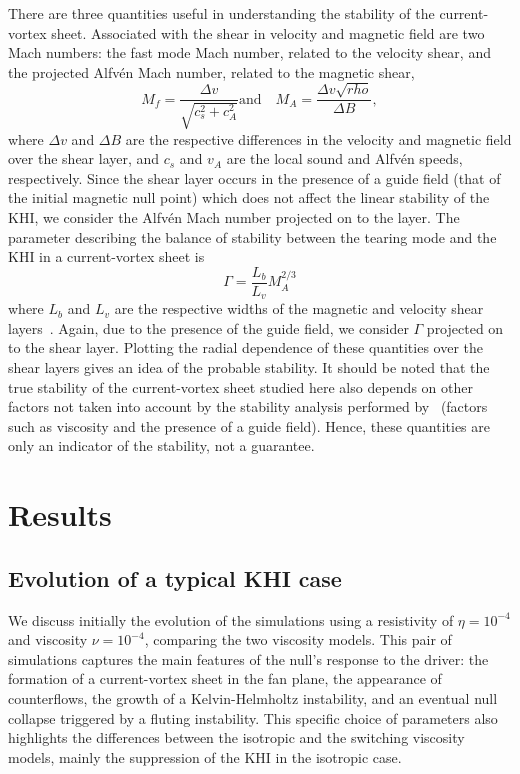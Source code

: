 There are three quantities useful in understanding the stability of the current-vortex sheet. Associated with the shear in velocity and magnetic field are two Mach numbers: the fast mode Mach number, related to the velocity shear, and the projected Alfv\'en Mach number, related to the magnetic shear,
\begin{equation}
  \label{eq:mach_numbers}
  M_f = \frac{\Delta v}{\sqrt{c_s^2 + c_A^2}} \text{and} \quad M_A = \frac{\Delta v \sqrt{rho}}{\Delta B},
\end{equation}
where $\Delta v$ and $\Delta B$ are the respective differences in the velocity and magnetic field over the shear layer, and $c_s$ and $v_A$ are the local sound and Alfv\'en speeds, respectively. Since the shear layer occurs in the presence of a guide field (that of the initial magnetic null point) which does not affect the linear stability of the KHI, we consider the Alfv\'en Mach number projected on to the layer. The parameter describing the balance of stability between the tearing mode and the KHI in a current-vortex sheet is
\begin{equation}
  \label{eq:khi_stability_param}
  \Gamma = \frac{L_b}{L_v} M_A^{2/3}
\end{equation}
where $L_b$ and $L_v$ are the respective widths of the magnetic and velocity shear layers~\cite{einaudiResistiveInstabilitiesFlowing1986}. Again, due to the presence of the guide field, we consider $\Gamma$ projected on to the shear layer. Plotting the radial dependence of these quantities over the shear layers gives an idea of the probable stability. It should be noted that the true stability of the current-vortex sheet studied here also depends on other factors not taken into account by the stability analysis performed by~\cite{einaudiResistiveInstabilitiesFlowing1986} (factors such as viscosity and the presence of a guide field). Hence, these quantities are only an indicator of the stability, not a guarantee.

\section{Results}

\subsection{Evolution of a typical KHI case}

We discuss initially the evolution of the simulations using a resistivity of $\eta = 10^{-4}$ and viscosity $\nu = 10^{-4}$, comparing the two viscosity models. This pair of simulations captures the main features of the null's response to the driver: the formation of a current-vortex sheet in the fan plane, the appearance of counterflows, the growth of a Kelvin-Helmholtz instability, and an eventual null collapse triggered by a fluting instability. This specific choice of parameters also highlights the differences between the isotropic and the switching viscosity models, mainly the suppression of the KHI in the isotropic case.

